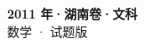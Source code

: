 \documentclass[zihao=-4, a4paper]{ctexart}
\begin{document}
\begin{center}
  {\Large\bfseries 2011 年·湖南卷·文科}\\[4pt]
  {\large 数学 · 试题版}
\end{center}
\medskip
{}

\end{document}
